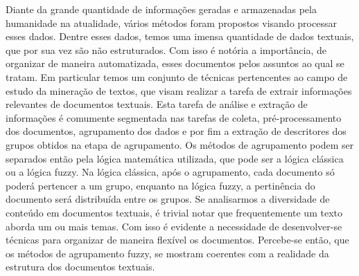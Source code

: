 
Diante da grande quantidade de informações geradas e armazenadas pela humanidade na atualidade, 
vários métodos foram propostos visando processar esses dados. Dentre esses dados, temos uma imensa
quantidade de dados textuais, que por sua vez são não estruturados. Com isso é notória a importância,
de organizar de maneira automatizada, esses documentos pelos assuntos ao qual se tratam. Em particular temos um conjunto de técnicas pertencentes ao campo de estudo da mineração de textos, que visam realizar a tarefa de extrair informações relevantes de documentos textuais. Esta tarefa de análise e extração de informações é 
comumente segmentada nas tarefas de coleta, pré-processamento dos documentos, agrupamento dos dados
e por fim a extração de descritores dos grupos obtidos na etapa de agrupamento. Os métodos de agrupamento podem ser separados então pela lógica matemática utilizada, que pode ser a lógica clássica ou a lógica fuzzy. Na lógica clássica, após o agrupamento, cada documento só poderá pertencer a um grupo, enquanto na lógica fuzzy, a pertinência do documento será distribuída entre os grupos. 
Se analisarmos a diversidade de conteúdo em documentos textuais, é trivial notar que frequentemente
um texto aborda um ou mais temas. Com isso é evidente a necessidade de desenvolver-se técnicas para
organizar de maneira flexível os documentos. Percebe-se então, que os métodos de agrupamento fuzzy,
se mostram coerentes com a realidade da estrutura dos documentos textuais.

